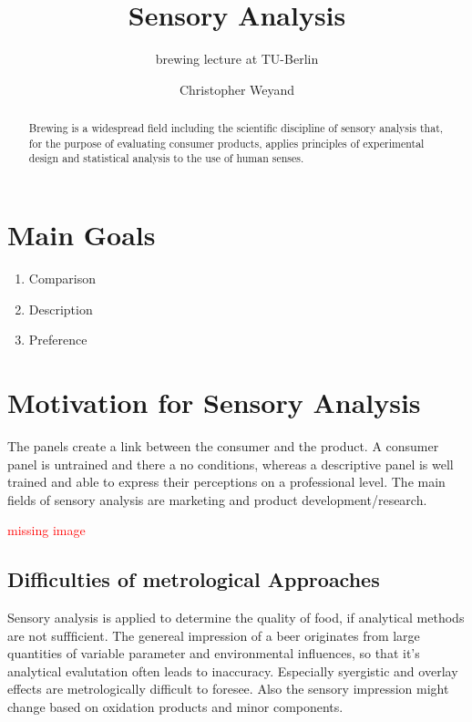 \documentclass[]{scrartcl}
\begin{document}
\title{Sensory Analysis}
\subtitle{brewing lecture at TU-Berlin}
\author{Christopher Weyand}
\maketitle
\begin{abstract}
Brewing is a widespread field including the scientific discipline of sensory analysis
that, for the purpose of evaluating consumer products, applies principles of experimental
design and statistical analysis to the use of human senses.
\end{abstract}
\newpage

\tableofcontents
\newpage

\listoffigures
\newpage


\section{Main Goals}
\begin{enumerate}
  \item Comparison
  \item Description
  \item Preference
\end{enumerate}

\section{Motivation for Sensory Analysis}
The panels create a link between the consumer and the product.
A consumer panel is untrained and there a no conditions, whereas a
descriptive panel is well trained and able to express their perceptions
on a professional level. The main fields of sensory analysis
are marketing and product development/research.

\textcolor{red}{missing image}

\subsection{Difficulties of metrological Approaches}
Sensory analysis is applied to determine the quality of food, if analytical
methods are not suffficient. The genereal impression of a beer originates from
large quantities of variable parameter and environmental influences,
so that it's analytical evalutation often leads to inaccuracy.
Especially syergistic and overlay effects are metrologically difficult to foresee.
Also the sensory impression might change based on oxidation products and
minor components.
\end{document}
